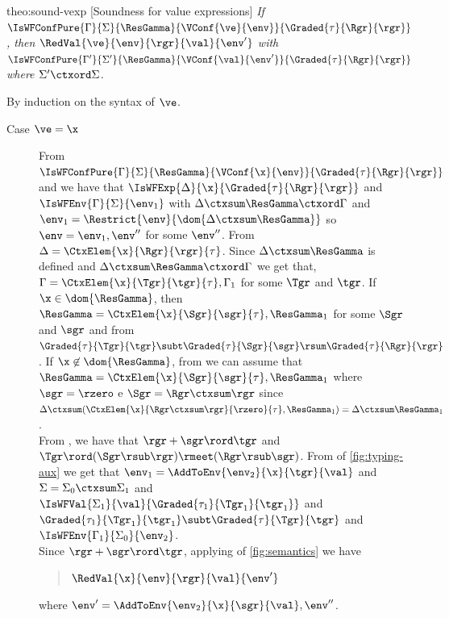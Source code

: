 \begin{proofOf}{theo:sound-vexp} [Soundness for value expressions]
{\em If $\IsWFConfPure{\Gamma}{\Sigma}{\ResGamma}{\VConf{\ve}{\env}}{\Graded{\tau}{\Rgr}{\rgr}}$,  then $\RedVal{\ve}{\env}{\rgr}{\val}{\env'}$ with $\IsWFConfPure{\Gamma'}{\Sigma'}{\ResGamma}{\VConf{\val}{\env'}}{\Graded{\tau}{\Rgr}{\rgr}}$
\bpa where  $\Sigma'\ctxord\Sigma$. \epa
 }

\smallskip\noindent
By induction on the syntax of $\ve$.
\begin{description}
\item [Case $\ve=\x$]

From $\IsWFConfPure{\Gamma}{\Sigma}{\ResGamma}{\VConf{\x}{\env}}{\Graded{\tau}{\Rgr}{\rgr}}$ and  we have that
$\IsWFExp{\Delta}{\x}{\Graded{\tau}{\Rgr}{\rgr}}$ and $\IsWFEnv{\Gamma}{\Sigma}{\env_1}$ with $\Delta\ctxsum\ResGamma\ctxord\Gamma$ and $\env_1=\Restrict{\env}{\dom{\Delta\ctxsum\ResGamma}}$ so $\env=\env_1,\env''$ for some $\env''$.
%
From   $\Delta=\CtxElem{\x}{\Rgr}{\rgr}{\tau}$. 
Since $\Delta\ctxsum\ResGamma$ is defined and $\Delta\ctxsum\ResGamma\ctxord\Gamma$ we get that, 
 $\Gamma=\CtxElem{\x}{\Tgr}{\tgr}{\tau},\Gamma_1$ for some $\Tgr$ and $\tgr$.
 If $\x\in\dom{\ResGamma}$,  then $\ResGamma=\CtxElem{\x}{\Sgr}{\sgr}{\tau},\ResGamma_1$ for some $\Sgr$ and $\sgr$
 and from  $\Graded{\tau}{\Tgr}{\tgr}\subt\Graded{\tau}{\Sgr}{\sgr}\rsum\Graded{\tau}{\Rgr}{\rgr}$.
 If $\x\not\in\dom{\ResGamma}$, from  we can assume that $\ResGamma=\CtxElem{\x}{\Sgr}{\sgr}{\tau},\ResGamma_1$ where
 $\sgr=\rzero$ e $\Sgr=\Rgr\ctxsum\rgr$ since $\Delta\ctxsum(\CtxElem{\x}{\Rgr\ctxsum\rgr}{\rzero}{\tau},\ResGamma_1)=\Delta\ctxsum\ResGamma_1$.\\
From , we have that $\rgr+\sgr\rord\tgr$ and    $\Tgr\rord(\Sgr\rsub\rgr)\rmeet(\Rgr\rsub\sgr)$.
From  of \cref{fig:typing-aux} we get  that $\env_1=\AddToEnv{\env_2}{\x}{\tgr}{\val}$ and $\Sigma=\Sigma_0\ctxsum\Sigma_1$ and 
 $\IsWFVal{\Sigma_1}{\val}{\Graded{{\tau_1}}{\Tgr_1}{\tgr_1}}$ and 
 $\Graded{{\tau_1}}{\Tgr_1}{\tgr_1}\subt\Graded{\tau}{\Tgr}{\tgr}$ 
and $\IsWFEnv{\Gamma_1}{\Sigma_0}{\env_2}$. \\
%
Since $\rgr+\sgr\rord\tgr$, applying   of \cref{fig:semantics} we have
\begin{quote}
$\RedVal{\x}{\env}{\rgr}{\val}{\env'}$  
\end{quote}
where $\env'=\AddToEnv{\env_2}{\x}{\sgr}{\val},\env''$.\\

\end{description}
\end{proofOf}
